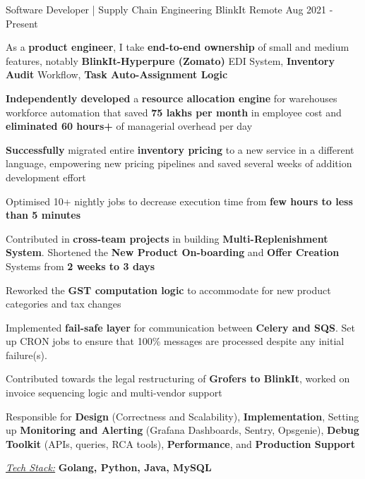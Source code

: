 \documentclass[11pt, a4paper]{awesome-cv} %
\begin{document}
\begin{cventries}

  \cventry
    {Software Developer | Supply Chain Engineering} %
    {BlinkIt} %
    {Remote} %
    {Aug 2021 - Present} %
    {
      \begin{cvitems} %
        \item {As a \textbf{product engineer}, I take \textbf{end-to-end ownership} of small and medium features, notably \textbf{BlinkIt-Hyperpure (Zomato)} EDI System, \textbf{Inventory Audit} Workflow, \textbf{Task Auto-Assignment Logic}}
        \item {\textbf{Independently developed} a \textbf{resource allocation engine} for warehouses workforce automation that saved \textbf{75 lakhs per month} in employee cost and \textbf{eliminated 60 hours+} of managerial overhead per day}
        \item {\textbf{Successfully} migrated entire \textbf{inventory pricing} to a new service in a different language, empowering new pricing pipelines and saved several weeks of addition development effort}
        \item{Optimised 10+ nightly jobs to decrease execution time from \textbf{few hours to less than 5 minutes}}
        \item {Contributed in \textbf{cross-team projects} in building \textbf{Multi-Replenishment System}. Shortened the \textbf{New Product On-boarding} and \textbf{Offer Creation} Systems from \textbf{2 weeks to 3 days}}
        \item{Reworked the \textbf{GST computation logic} to accommodate for new product categories and tax changes}
        \item {Implemented \textbf{fail-safe layer} for communication between \textbf{Celery and SQS}. Set up CRON jobs to ensure that 100\% messages are processed despite any initial failure(s).}
        \item {Contributed towards the legal restructuring of \textbf{Grofers to BlinkIt}, worked on invoice sequencing logic and multi-vendor support}
        \item {Responsible for \textbf{Design} (Correctness and Scalability), \textbf{Implementation}, Setting up \textbf{Monitoring and Alerting} (Grafana Dashboards, Sentry, Opsgenie), \textbf{Debug Toolkit} (APIs, queries, RCA tools), \textbf{Performance}, and \textbf{Production Support}}
        \item {\textit{\href{}{\color{awesome-red} Tech Stack:}} \textbf{Golang, Python, Java, MySQL}}
      \end{cvitems}
    }



\end{cventries}
\end{document}

